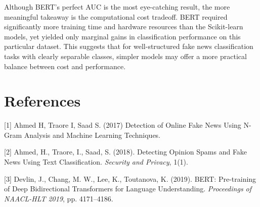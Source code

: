 \documentclass{article}
\begin{document}
Although BERT's perfect AUC is the most eye-catching result, the more meaningful takeaway is the computational cost tradeoff. BERT required significantly more training time and hardware resources than the Scikit-learn models, yet yielded only marginal gains in classification performance on this particular dataset. This suggests that for well-structured fake news classification tasks with clearly separable classes, simpler models may offer a more practical balance between cost and performance.

\section*{References}

{\small

[1] Ahmed H, Traore I, Saad S. (2017) Detection of Online Fake News Using N-Gram Analysis and Machine Learning Techniques.

[2] Ahmed, H., Traore, I., Saad, S. (2018). Detecting Opinion Spams and Fake News Using Text Classification. {\it Security and Privacy}, 1(1).

[3] Devlin, J., Chang, M. W., Lee, K., Toutanova, K. (2019). BERT: Pre-training of Deep Bidirectional Transformers for Language Understanding. {\it Proceedings of NAACL-HLT 2019}, pp. 4171--4186.

}
\end{document}
